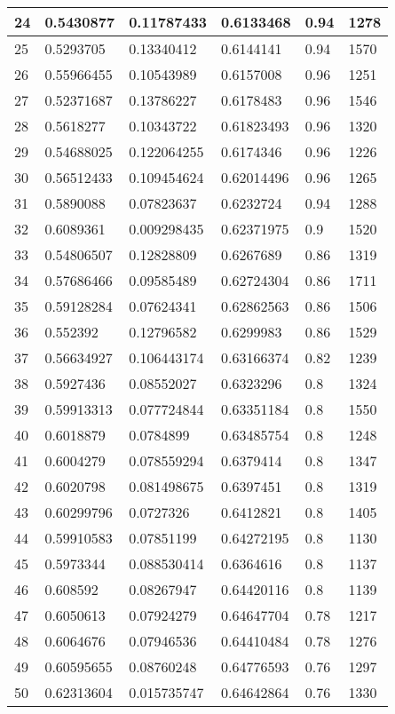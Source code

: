 \begin{longtable}{|l|l|l|l|l|l|}
24 & 0.5430877 & 0.11787433 & 0.6133468 & 0.94 & 1278 \\ \hline 
25 & 0.5293705 & 0.13340412 & 0.6144141 & 0.94 & 1570 \\ \hline 
26 & 0.55966455 & 0.10543989 & 0.6157008 & 0.96 & 1251 \\ \hline 
27 & 0.52371687 & 0.13786227 & 0.6178483 & 0.96 & 1546 \\ \hline 
28 & 0.5618277 & 0.10343722 & 0.61823493 & 0.96 & 1320 \\ \hline 
29 & 0.54688025 & 0.122064255 & 0.6174346 & 0.96 & 1226 \\ \hline 
30 & 0.56512433 & 0.109454624 & 0.62014496 & 0.96 & 1265 \\ \hline 
31 & 0.5890088 & 0.07823637 & 0.6232724 & 0.94 & 1288 \\ \hline 
32 & 0.6089361 & 0.009298435 & 0.62371975 & 0.9 & 1520 \\ \hline 
33 & 0.54806507 & 0.12828809 & 0.6267689 & 0.86 & 1319 \\ \hline 
34 & 0.57686466 & 0.09585489 & 0.62724304 & 0.86 & 1711 \\ \hline 
35 & 0.59128284 & 0.07624341 & 0.62862563 & 0.86 & 1506 \\ \hline 
36 & 0.552392 & 0.12796582 & 0.6299983 & 0.86 & 1529 \\ \hline 
37 & 0.56634927 & 0.106443174 & 0.63166374 & 0.82 & 1239 \\ \hline 
38 & 0.5927436 & 0.08552027 & 0.6323296 & 0.8 & 1324 \\ \hline 
39 & 0.59913313 & 0.077724844 & 0.63351184 & 0.8 & 1550 \\ \hline 
40 & 0.6018879 & 0.0784899 & 0.63485754 & 0.8 & 1248 \\ \hline 
41 & 0.6004279 & 0.078559294 & 0.6379414 & 0.8 & 1347 \\ \hline 
42 & 0.6020798 & 0.081498675 & 0.6397451 & 0.8 & 1319 \\ \hline 
43 & 0.60299796 & 0.0727326 & 0.6412821 & 0.8 & 1405 \\ \hline 
44 & 0.59910583 & 0.07851199 & 0.64272195 & 0.8 & 1130 \\ \hline 
45 & 0.5973344 & 0.088530414 & 0.6364616 & 0.8 & 1137 \\ \hline 
46 & 0.608592 & 0.08267947 & 0.64420116 & 0.8 & 1139 \\ \hline 
47 & 0.6050613 & 0.07924279 & 0.64647704 & 0.78 & 1217 \\ \hline 
48 & 0.6064676 & 0.07946536 & 0.64410484 & 0.78 & 1276 \\ \hline 
49 & 0.60595655 & 0.08760248 & 0.64776593 & 0.76 & 1297 \\ \hline 
50 & 0.62313604 & 0.015735747 & 0.64642864 & 0.76 & 1330 \\ \hline 
\end{longtable}